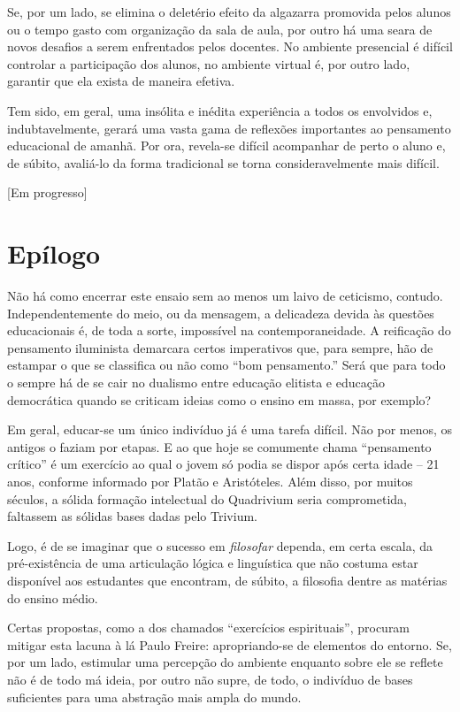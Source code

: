 \documentclass[12pt,a4paper]{article}
\begin{document}
	Se, por um lado, se elimina o deletério efeito da algazarra 
	promovida pelos alunos ou o tempo gasto com organização da sala de 
	aula, por outro há uma seara de novos desafios a serem enfrentados 
	pelos docentes. No ambiente presencial é difícil controlar a 
	participação dos alunos, no ambiente virtual é, por outro lado, 
	garantir que ela exista de maneira efetiva. 

	Tem sido, em geral, uma insólita e inédita experiência a todos os 
	envolvidos e, indubtavelmente, gerará uma vasta gama de reflexões 
	importantes ao pensamento educacional de amanhã. Por ora, revela-se 
	difícil acompanhar de perto o aluno e, de súbito, avaliá-lo da forma 
	tradicional se torna consideravelmente mais difícil. 

	[Em progresso]
	

	\newpage
	
	\section{Epílogo}

	Não há como encerrar este ensaio sem ao menos um laivo de ceticismo, 
	contudo. Independentemente do meio, ou da mensagem, a delicadeza 
	devida às questões educacionais é, de toda a sorte, impossível na 
	contemporaneidade. A reificação do pensamento iluminista demarcara 
	certos imperativos que, para sempre, hão de estampar o que se 
	classifica ou não como “bom pensamento.” Será que para todo o sempre 
	há de se cair no dualismo entre educação elitista e educação 
	democrática quando se criticam ideias como o ensino em massa, 
	por exemplo? 

	Em geral, educar-se um único indivíduo já é uma tarefa difícil. 
	Não por menos, os antigos o faziam por etapas. E ao que hoje se 
	comumente chama “pensamento crítico” é um exercício ao qual o 
	jovem só podia se dispor após certa idade -- 21 anos, conforme 
	informado por Platão e Aristóteles. Além disso, por muitos 
	séculos, a sólida formação intelectual do Quadrivium seria 
	comprometida, faltassem as sólidas bases dadas pelo Trivium. 

	Logo, é de se imaginar que o sucesso em \textit{filosofar} 
	dependa, em certa escala, da pré-existência de uma articulação 
	lógica e linguística que não costuma estar disponível aos 
	estudantes que encontram, de súbito, a filosofia dentre as 
	matérias do ensino médio. 

	Certas propostas, como a dos chamados “exercícios espirituais”, 
	procuram mitigar esta lacuna à lá Paulo Freire: apropriando-se 
	de elementos do entorno. Se, por um lado, estimular uma percepção 
	do ambiente enquanto sobre ele se reflete não é de todo má ideia, 
	por outro não supre, de todo, o indivíduo de bases suficientes 
	para uma abstração mais ampla do mundo. 
\end{document}
